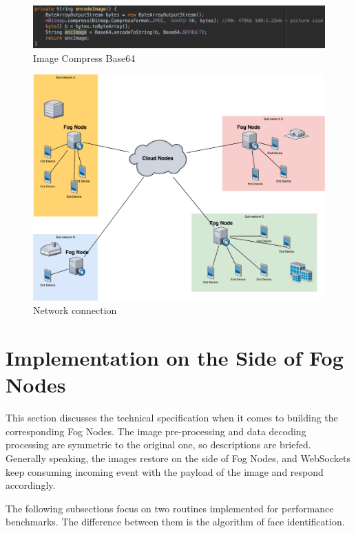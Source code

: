 \begin{figure}
    \centering
    \includegraphics[width=\textwidth]{images/png&base64.png}
    \caption{Image Compress  Base64}
    \label{fig:png_base64}
\end{figure}



\begin{figure}
    \centering
    \includegraphics[width=\textwidth]{images/network.png}
    \caption{Network connection}
    \label{fig:network}
\end{figure}


\section{Implementation on the Side of Fog Nodes}
This section discusses the technical specification when it comes to building the corresponding Fog Nodes. The image pre-processing and data decoding processing are symmetric to the original one, so descriptions are briefed. Generally speaking, the images restore on the side of Fog Nodes, and WebSockets keep consuming incoming event with the payload of the image and respond accordingly.

The following subsections focus on two routines implemented for performance benchmarks. The difference between them is the algorithm of face identification.

